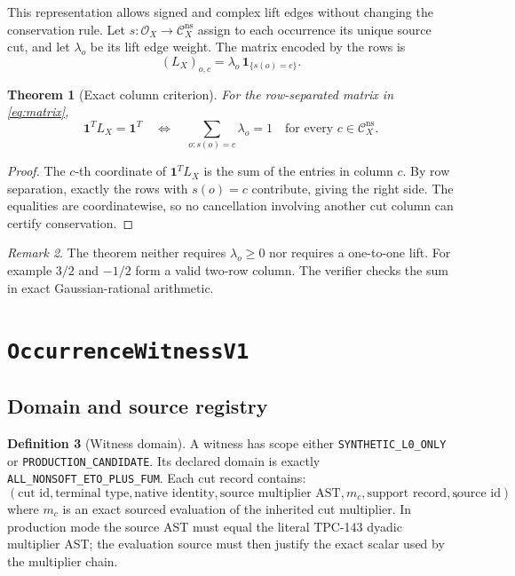 \documentclass[11pt]{article}
\newtheorem{theorem}{Theorem}[section]
\numberwithin{equation}{section}
\theoremstyle{definition}
\newtheorem{definition}[theorem]{Definition}
\theoremstyle{remark}
\newtheorem{remark}[theorem]{Remark}
\newcommand{\Cns}{\mathcal C_X^{\mathrm{ns}}}
\newcommand{\Oh}{\mathcal O_X}
\newcommand{\one}{\mathbf 1}
\begin{document}
This representation allows signed and complex lift edges without
changing the conservation rule.  Let \(s:\Oh\to\Cns\) assign to each
occurrence its unique source cut, and let \(\lambda_o\) be its lift
edge weight.  The matrix encoded by the rows is
\begin{equation}
 (L_X)_{o,c}=\lambda_o\,\mathbf 1_{\{s(o)=c\}}.
 \label{eq:matrix}
\end{equation}

\begin{theorem}[Exact column criterion]
\label{thm:column}
For the row-separated matrix in \cref{eq:matrix},
\begin{equation}
 \one^T L_X=\one^T
 \quad\Longleftrightarrow\quad
 \sum_{o:s(o)=c}\lambda_o=1
 \quad\text{for every }c\in\Cns.
\end{equation}
\end{theorem}

\begin{proof}
The \(c\)-th coordinate of \(\one^T L_X\) is the sum of the entries
in column \(c\).  By row separation, exactly the rows with \(s(o)=c\)
contribute, giving the right side.  The equalities are coordinatewise,
so no cancellation involving another cut column can certify
conservation.
\end{proof}

\begin{remark}
The theorem neither requires \(\lambda_o\ge0\) nor requires a
one-to-one lift.  For example \(3/2\) and \(-1/2\) form a valid
two-row column.  The verifier checks the sum in exact
Gaussian-rational arithmetic.
\end{remark}

\section{\texttt{OccurrenceWitnessV1}}

\subsection{Domain and source registry}

\begin{definition}[Witness domain]
A witness has scope either
\nolinkurl{SYNTHETIC_L0_ONLY} or
\nolinkurl{PRODUCTION_CANDIDATE}.  Its declared domain is exactly
\texttt{ALL\_NONSOFT\_ETO\_PLUS\_FUM}.  Each cut record contains:
\[
 (\text{cut id},\text{terminal type},\text{native identity},
   \text{source multiplier AST},m_c,
   \text{support record},\text{source id}),
\]
where \(m_c\) is an exact sourced evaluation of the inherited cut
multiplier.  In production mode the source AST must equal the literal
TPC-143 dyadic multiplier AST; the evaluation source must then justify
the exact scalar used by the multiplier chain.
\end{definition}
\end{document}
